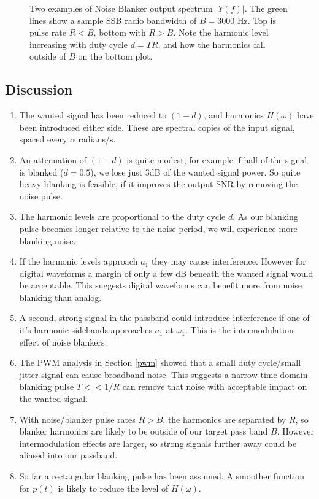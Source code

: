 \documentclass{article}
\begin{document}
\begin{figure}[h]
\caption{Two examples of Noise Blanker output spectrum $|Y(f)|$.  The green lines show a sample SSB radio bandwidth of $B=3000$ Hz. Top is pulse rate $R<B$, bottom with $R>B$.  Note the harmonic level increasing with duty cycle $d=TR$, and how the harmonics fall outside of $B$ on the bottom plot. }
\label{fig:blanker}
\begin{center}

\end{center}
\end{figure}

\subsection{Discussion}
\label{blanker_discussion}

\begin{enumerate}
\item The wanted signal has been reduced to $(1-d)$, and harmonics $H(\omega)$ have been introduced either side.  These are spectral copies of the input signal, spaced every $\alpha$ radians/s.
\item An attenuation of $(1-d)$ is quite modest, for example if half of the signal is blanked ($d=0.5$), we lose just 3dB of the wanted signal power.  So quite heavy blanking is feasible, if it improves the output SNR by removing the noise pulse.
\item The harmonic levels are proportional to the duty cycle $d$.  As our blanking pulse becomes longer relative to the noise period, we will experience more blanking noise.
\item If the harmonic levels approach $a_1$ they may cause interference.  However for digital waveforms a margin of only a few dB beneath the wanted signal would be acceptable.  This suggests digital waveforms can benefit more from noise blanking than analog. 
\item A second, strong signal in the passband could introduce interference if one of it's harmonic sidebands approaches $a_1$ at $\omega_1$.  This is the intermodulation effect of noise blankers.
\item The PWM analysis in Section \ref{pwm} showed that a small duty cycle/small jitter signal can cause broadband noise.  This suggests a narrow time domain blanking pulse $T<<1/R$ can remove that noise with acceptable impact on the wanted signal. 
\item With noise/blanker pulse rates $R>B$, the harmonics are separated by $R$, so blanker harmonics are likely to be outside of our target pass band $B$.  However intermodulation effects are larger, so strong signals further away could be aliased into our passband. 
\item So far a rectangular blanking pulse has been assumed. A smoother function for $p(t)$ is likely to reduce the level of $H(\omega)$. 
\end{enumerate}
\end{document}

